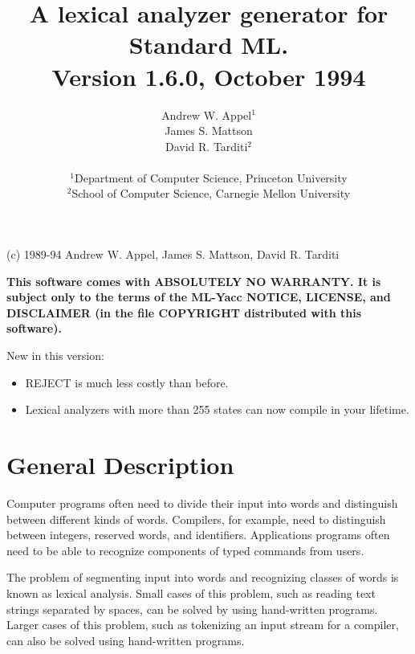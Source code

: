 \title{        A lexical analyzer generator for Standard ML.\\
                               Version 1.6.0, October 1994
      }
\author{                    Andrew W. Appel$^1$\\
                            James S. Mattson\\
                            David R. Tarditi$^2$\\
\\              
\small
$^1$Department of Computer Science, Princeton University \\
\small
$^2$School of Computer Science, Carnegie Mellon University
}
\date{}

\maketitle
\begin{center}
(c) 1989-94 Andrew W. Appel, James S. Mattson, David R. Tarditi
\end{center}

{\bf
This software comes with ABSOLUTELY NO WARRANTY.  It is subject only to
the terms of the ML-Yacc NOTICE, LICENSE, and DISCLAIMER (in the
file COPYRIGHT distributed with this software).
}

\vspace{1in}

New in this version:  
\begin{itemize}
\item REJECT is much less costly than before.
\item Lexical analyzers with more than 255 states can now compile in your
lifetime.
\end{itemize}

\newpage
\tableofcontents
\newpage

\section{General Description}

Computer programs often need to divide their input into words and
distinguish between different kinds of words.  Compilers, for
example, need to distinguish between integers, reserved words, and
identifiers.  Applications programs often need to be able to
recognize components of typed commands from users.

The problem of segmenting input into words and recognizing classes of
words is known as lexical analysis.  Small cases of this problem,
such as reading text strings separated by spaces, can be solved by
using hand-written programs.  Larger cases of this problem, such as
tokenizing an input stream for a compiler, can also be solved using
hand-written programs.

